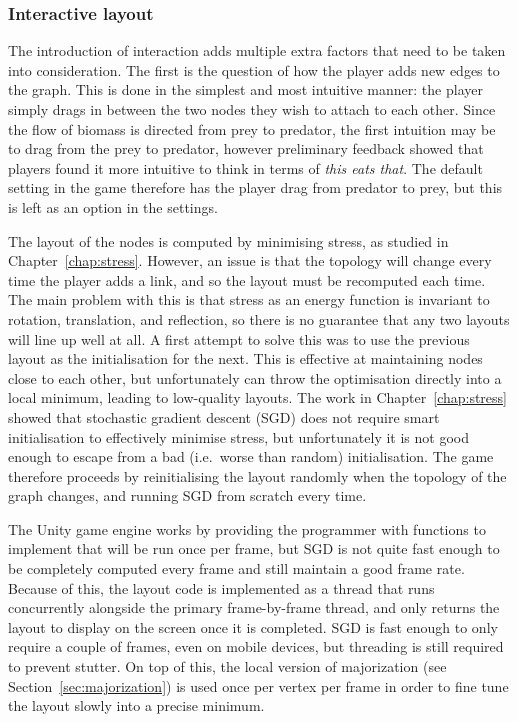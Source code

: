 \subsubsection{Interactive layout}
The introduction of interaction adds multiple extra factors that need to be taken into consideration.
The first is the question of how the player adds new edges to the graph. This is done in the simplest and most intuitive manner: the player simply drags in between the two nodes they wish to attach to each other. Since the flow of biomass is directed from prey to predator, the first intuition may be to drag from the prey to predator, however preliminary feedback showed that players found it more intuitive to think in terms of \emph{this eats that}. The default setting in the game therefore has the player drag from predator to prey, but this is left as an option in the settings.

The layout of the nodes is computed by minimising stress, as studied in Chapter~\ref{chap:stress}.
However, an issue is that the topology will change every time the player adds a link, and so the layout must be recomputed each time.
The main problem with this is that stress as an energy function is invariant to rotation, translation, and reflection, so there is no guarantee that any two layouts will line up well at all.
A first attempt to solve this was to use the previous layout as the initialisation for the next. This is effective at maintaining nodes close to each other, but unfortunately can throw the optimisation directly into a local minimum, leading to low-quality layouts. The work in Chapter~\ref{chap:stress} showed that stochastic gradient descent (SGD) does not require smart initialisation to effectively minimise stress, but unfortunately it is not good enough to escape from a bad (i.e.\ worse than random) initialisation.
The game therefore proceeds by reinitialising the layout randomly when the topology of the graph changes, and running SGD from scratch every time. 

The Unity game engine works by providing the programmer with functions to implement that will be run once per frame, but SGD is not quite fast enough to be completely computed every frame and still maintain a good frame rate.
Because of this, the layout code is implemented as a thread that runs concurrently alongside the primary frame-by-frame thread, and only returns the layout to display on the screen once it is completed. SGD is fast enough to only require a couple of frames, even on mobile devices, but threading is still required to prevent stutter.
On top of this, the local version of majorization (see Section~\ref{sec:majorization}) is used once per vertex per frame in order to fine tune the layout slowly into a precise minimum.

